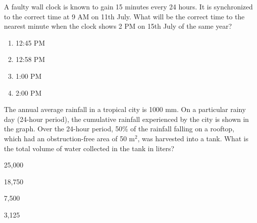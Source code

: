     \item{
            A faulty wall clock is known to gain 15 minutes every 24 hours. It is synchronized to the correct time at 9 AM on 11th July. What will be the correct time to the nearest minute when the clock shows 2 PM on 15th July of the same year?
            
            
                
            \begin{multicols}{4}
                \begin{enumerate}
                	\item 12:45 PM 
                	\item 12:58 PM
                	\item 1:00 PM
                	\item 2:00 PM
                \end{enumerate}
            \end{multicols}

        
        }
    \item{
            The annual average rainfall in a tropical city is 1000 mm. On a particular rainy day (24-hour period), the cumulative rainfall experienced by the city is shown in the graph. Over the 24-hour period, 50\% of the rainfall falling on a rooftop, which had an obstruction-free area of 50 m$^2$, was harvested into a tank. What is the total volume of water collected in the tank in liters?
          \begin{center}
          \end{center}
            \begin{enumerate}
            	\begin{multicols}{4}
            		\item 25,000
            		\item 18,750
            		\item 7,500
            		\item 3,125
            	\end{multicols}
            \end{enumerate}
        
        }
